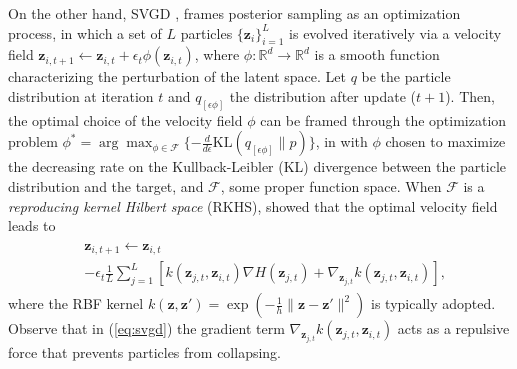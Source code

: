 On the other hand, SVGD \cite{liu2016stein}, frames posterior sampling as an optimization process, in which a set of $L$ particles $\lbrace \bm{z}_i \rbrace_{i=1}^L$ is evolved iteratively via a velocity field $\bm{z}_{i, t+1} \leftarrow \bm{z}_{i, t} + \epsilon_t \phi(\bm{z}_{i,t})$, where $\phi : \mathbb{R}^d \rightarrow \mathbb{R}^d$ is a smooth function characterizing the perturbation of the latent space.
Let $q$ be the particle distribution at iteration $t$ and $q_{\left[ \epsilon \phi \right]}$ the distribution after update ($t+1$). Then, the optimal choice of the velocity field $\phi$ can be framed through the optimization problem $\phi^* = \arg\max_{\phi \in \mathcal{F}} \lbrace -\frac{d}{d\epsilon} \mbox{KL}( q_{\left[ \epsilon \phi \right]} \| p) \rbrace$, in with $\phi$ chosen to maximize the decreasing rate on the Kullback-Leibler (KL) divergence between the particle distribution and the target, and $\mathcal{F}$, some proper function space. When $\mathcal{F}$ is a \emph{reproducing kernel Hilbert space} (RKHS), \cite{liu2016stein} showed that the optimal velocity field leads to
\begin{align}\label{eq:svgd}
\begin{split}
&\bm{z}_{i, t+1} \leftarrow \bm{z}_{i, t} \\&- \epsilon_t \frac{1}{L}  \sum_{j=1}^L \left[ k(\bm{z}_{j, t}, \bm{z}_{i, t})\nabla H(\bm{z}_{j,t}) + \nabla_{\bm{z}_{j, t}}  k(\bm{z}_{j, t}, \bm{z}_{i, t})  \right],
\end{split}
\end{align}
where the RBF kernel $k(\bm{z}, \bm{z}') = \exp (-\frac{1}{h}  \| \bm{z} - \bm{z}' \|^2 )$ is typically adopted. Observe that in (\ref{eq:svgd}) the gradient term $\nabla_{\bm{z}_{j, t}}  k(\bm{z}_{j, t}, \bm{z}_{i, t})$ acts as a repulsive force that prevents particles from collapsing. 



